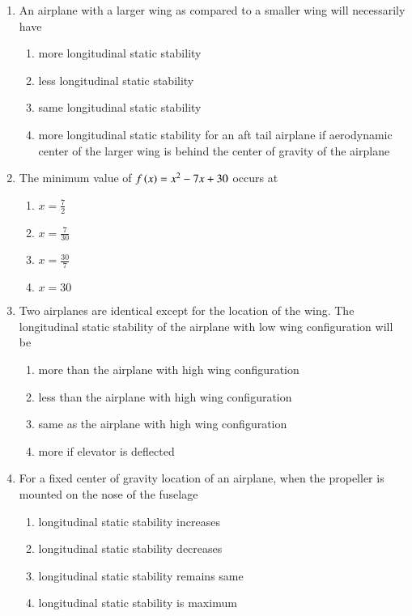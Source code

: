 \documentclass[journal]{IEEEtran}
\begin{document}
\begin{enumerate}
\item An airplane with a larger wing as compared to a smaller wing will necessarily have
\begin{enumerate}
\item more longitudinal static stability
\item less longitudinal static stability
\item same longitudinal static stability
\item more longitudinal static stability for an aft tail airplane if aerodynamic center of the larger wing is behind the center of gravity of the airplane
\end{enumerate}


\item The minimum value of $f\left(x\right)=x^{2}-7x+30$ occurs at
\begin{multicols}{2}
\begin{enumerate}
\item $x=\frac{7}{2}$
\item $x=\frac{7}{30}$
\item $x=\frac{30}{7}$
\item $x=30$
\end{enumerate}
\end{multicols}


\item Two airplanes are identical except for the location of the wing. The longitudinal static stability of the airplane with low wing configuration will be
\begin{enumerate}
\item more than the airplane with high wing configuration
\item less than the airplane with high wing configuration
\item same as the airplane with high wing configuration
\item more if elevator is deflected
\end{enumerate}

\item For a fixed center of gravity location of an airplane, when the propeller is mounted on the nose of the fuselage
\begin{enumerate}
\item longitudinal static stability increases
\item longitudinal static stability decreases
\item longitudinal static stability remains same
\item longitudinal static stability is maximum
\end{enumerate}



\end{enumerate}
\end{document}
